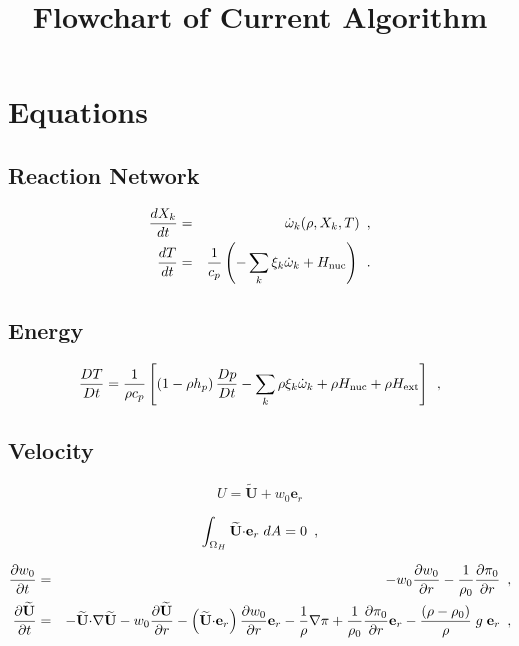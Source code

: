 \documentclass[11pt]{article}
\title{Flowchart of Current Algorithm}
\newcommand{\rhozero}{\rho_0}
\newcommand{\pizero}{\pi_0}
\newcommand{\nablab}{\mathbf{\nabla}}
\newcommand{\cdotb}{\mathbf{\cdot}}
\newcommand{\Hext}{{H_{\rm ext}}}
\newcommand{\Hnuc}{{H_{\rm nuc}}}
\newcommand{\ubold}{\mathbf{U}}
\newcommand{\ut}{\widetilde{\ubold}}
\newcommand{\omegadot}{\dot{\omega}}
\newcommand{\er}{\mathbf{e}_r}
\begin{document}
\maketitle
\tableofcontents
\cleardoublepage

\section{Equations}

\subsection{Reaction Network}
\begin{eqnarray}
\frac{dX_k}{dt} &=& \omegadot_k(\rho,X_k,T)\enskip, \label{eq:VODE1C} \\
\frac{dT}{dt} &=&\frac{1}{c_p} \left ( -\sum_k \xi_k  \omegadot_k  + \Hnuc \right )\enskip. \label{eq:tempreactC}
\end{eqnarray}



\subsection{Energy}

\begin{equation}
\label{eq:tempenthalpy}
\frac{DT}{Dt} = \frac{1}{\rho c_p} \left[ \left(1 - \rho h_p\right) \frac{D p}{D t}
 - \sum_k \rho \xi_k {\omegadot}_k 
 + \rho \Hnuc + \rho \Hext \right] \enskip , 
\end{equation}



\subsection{Velocity}

\begin{equation}
U = \ut + w_0 \er
\end{equation}

\begin{equation}
\int_{\Omega_H} \ut \cdotb \er \; dA = 0 \label{eq:udoterzero} \enskip ,
\end{equation}

\begin{eqnarray}
\frac{\partial w_0}{\partial t} &=& - w_0 \frac{\partial w_0}{\partial r} - 
\frac{1}{\rho_0} \frac{\partial \pizero}{\partial r} \label{eq:w0upd} \enskip , \\
\frac{\partial\ut}{\partial t} &=& - \ut \cdotb \nablab \ut - w_0 \frac{\partial \ut}{\partial r}
                                 - \left(\ut \cdotb \er\right) \frac{\partial w_0}{\partial r} \er
                                 - \frac{1}{\rho} \nablab\pi
                                 + \frac{1}{\rho_0} \frac{\partial \pizero}{\partial r} \er
                                 - \frac{(\rho-\rhozero)}{\rho} \; g \; \er  \label{eq:utildeupd}  \enskip ,
\end{eqnarray}
\end{document}
